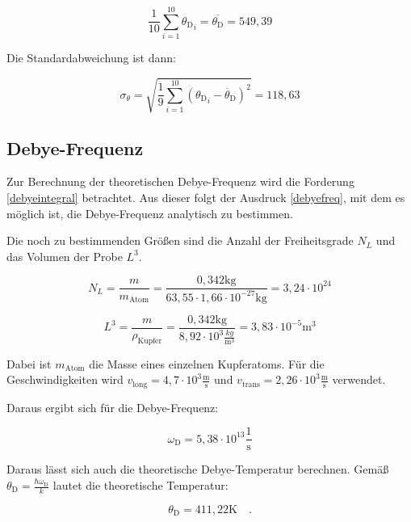 \begin{equation}
\frac{1}{10}\sum\limits_{i=1}^{10}{\theta_{\text{D}}}_i=\overline{\theta_\text{D}}=549,39
\end{equation}

\noindent Die Standardabweichung ist dann:

\begin{equation}
\sigma_\theta=\sqrt{\frac{1}{9}\sum\limits_{i=1}^{10}({\theta_{\text{D}}}_i-\overline \theta_{\text{D}})^2}=118,63
\end{equation}

\subsection{Debye-Frequenz}
Zur Berechnung der theoretischen Debye-Frequenz wird die Forderung \eqref{debyeintegral} betrachtet. Aus dieser folgt der Ausdruck \eqref{debyefreq}, mit dem es möglich ist, die Debye-Frequenz analytisch zu bestimmen.

\noindent Die noch zu bestimmenden Größen sind die Anzahl der Freiheitsgrade \(N_L\) und das Volumen der Probe \(L^3\).

\begin{equation*}
N_L=\frac{m}{m_\text{Atom}}=\frac{0,342\text{kg}}{63,55\cdot 1,66\cdot10^{-27}\text{kg}}=3,24\cdot10^{24}
\end{equation*}

\begin{equation*}
L^3=\frac{m}{\rho_\text{Kupfer}}=\frac{0,342\text{kg}}{8,92\cdot10^3\frac{kg}{\text{m}^3}}=3,83\cdot10^{-5}\text{m}^3
\end{equation*}

\noindent Dabei ist \(m_\text{Atom}\) die Masse eines einzelnen Kupferatoms. Für die Geschwindigkeiten wird \(v_\text{long}=4,7\cdot10^3\frac{\text{m}}{\text{s}}\) und \(v_\text{trans}=2,26\cdot10^3\frac{\text{m}}{\text{s}}\) verwendet.

\noindent Daraus ergibt sich für die Debye-Frequenz:

\begin{equation*}
\omega_\text{D}=5,38\cdot10^{13}\frac{1}{\text{s}}
\end{equation*}

\noindent Daraus lässt sich auch die theoretische Debye-Temperatur berechnen. Gemäß $\theta_\text{D}=\frac{\hbar\omega_\text{D}}{k}$ lautet die theoretische Temperatur:

\begin{equation*}
\theta_\text{D}=411,22\text{K}\quad.
\end{equation*}